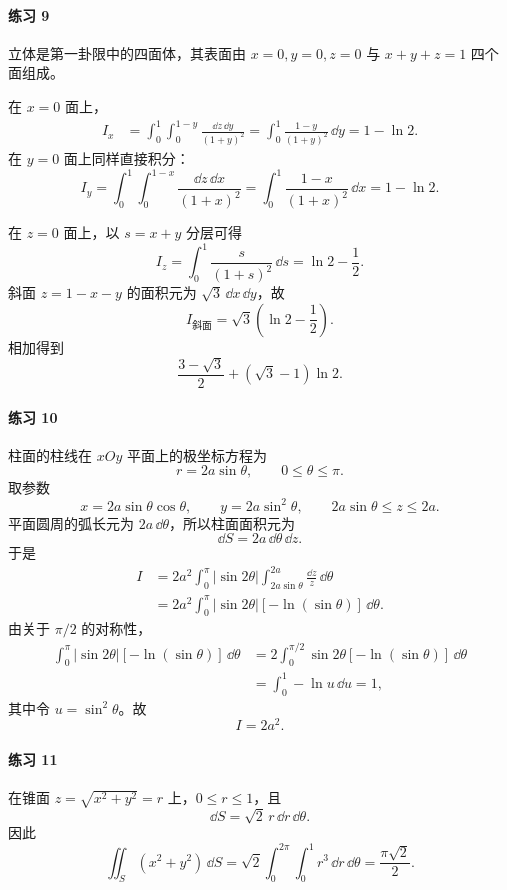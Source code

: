 \paragraph{练习 9}
\begin{xsolution}
立体是第一卦限中的四面体，其表面由 $x=0,y=0,z=0$ 与 $x+y+z=1$ 四个面组成。

在 $x=0$ 面上，
\begin{align*}
I_x
&=\int_0^1\int_0^{1-y}\frac{\dd z\,\dd y}{(1+y)^2}
=\int_0^1\frac{1-y}{(1+y)^2}\,\dd y
=1-\ln2.
\end{align*}
在 $y=0$ 面上同样直接积分：
\[
I_y=\int_0^1\int_0^{1-x}\frac{\dd z\,\dd x}{(1+x)^2}
=\int_0^1\frac{1-x}{(1+x)^2}\,\dd x
=1-\ln2.
\]

在 $z=0$ 面上，以 $s=x+y$ 分层可得
\[
I_z=\int_0^1\frac{s}{(1+s)^2}\,\dd s
=\ln2-\frac12.
\]
斜面 $z=1-x-y$ 的面积元为 $\sqrt3\,\dd x\,\dd y$，故
\[
I_{\text{斜面}}=\sqrt3\left(\ln2-\frac12\right).
\]
相加得到
\[
  \boxed{\frac{3-\sqrt3}{2}+(\sqrt3-1)\ln2}.
\]
\end{xsolution}

\paragraph{练习 10}
\begin{xsolution}
柱面的柱线在 $xOy$ 平面上的极坐标方程为
\[
  r=2a\sin\theta,\qquad0\le\theta\le\pi.
\]
取参数
\[
  x=2a\sin\theta\cos\theta,\qquad
  y=2a\sin^2\theta,\qquad
  2a\sin\theta\le z\le2a.
\]
平面圆周的弧长元为 $2a\,\dd\theta$，所以柱面面积元为
\[
  \dd S=2a\,\dd\theta\,\dd z.
\]
于是
\begin{align*}
I
&=2a^2\int_0^\pi|\sin2\theta|
   \int_{2a\sin\theta}^{2a}\frac{\dd z}{z}\,\dd\theta\\
&=2a^2\int_0^\pi|\sin2\theta|[-\ln(\sin\theta)]\,\dd\theta.
\end{align*}
由关于 $\pi/2$ 的对称性，
\begin{align*}
\int_0^\pi|\sin2\theta|[-\ln(\sin\theta)]\,\dd\theta
&=2\int_0^{\pi/2}\sin2\theta[-\ln(\sin\theta)]\,\dd\theta\\
&=\int_0^1-\ln u\,\dd u=1,
\end{align*}
其中令 $u=\sin^2\theta$。故
\[
  \boxed{I=2a^2}.
\]
\end{xsolution}

\paragraph{练习 11}
\begin{xsolution}
在锥面 $z=\sqrt{x^2+y^2}=r$ 上，$0\le r\le1$，且
\[
  \dd S=\sqrt2\,r\,\dd r\,\dd\theta.
\]
因此
\[
  \iint_S(x^2+y^2)\,\dd S
  =\sqrt2\int_0^{2\pi}\int_0^1r^3\,\dd r\,\dd\theta
  =\frac{\pi\sqrt2}{2}.
\]
\end{xsolution}


